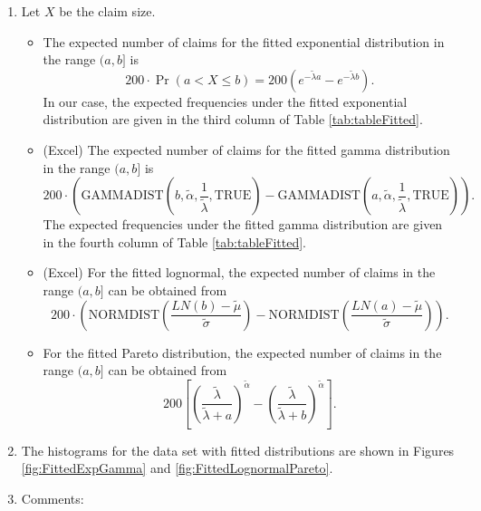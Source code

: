 \documentclass[landscape, 20pt]{extreport}
\theoremstyle{definition}
\theoremstyle{definition}
\theoremstyle{definition}
\theoremstyle{definition}
\theoremstyle{remark}
\begin{document}
\begin{enumerate}
\def\labelenumi{\arabic{enumi}.}
\setcounter{enumi}{4}
\item
  Let \(X\) be the claim size.

  \begin{itemize}
  \item
    The expected number of claims for the fitted exponential
    distribution in the range \((a,b]\) is
    \[200 \cdot \Pr( a < X \le b) = 200( e^{-\tilde{\lambda} a} - e^{-\tilde{\lambda} b} ).\]
    In our case, the expected frequencies under the fitted
    exponential distribution are given in the third column of Table \ref{tab:tableFitted}.
  \item
    (Excel) The expected number of claims for the fitted gamma distribution
    in the range \((a,b]\) is
    \[200 \cdot\left(  \text{GAMMADIST}\left(b, \tilde{\alpha}, \frac{1}{\tilde{\lambda}}, \text{TRUE}\right)  - \text{GAMMADIST}\left(a, \tilde{\alpha}, \frac{1}{\tilde{\lambda}}, \text{TRUE}\right) \right).\]
    The expected frequencies under the fitted gamma distribution are
    given in the fourth column of Table \ref{tab:tableFitted}.
  \item
    (Excel) For the fitted lognormal, the expected number of claims in the
    range \((a,b]\) can be obtained from
    \[200 \cdot\left(  \text{NORMDIST} \left(\frac{LN(b) - 
            \tilde{\mu}}{\tilde{\sigma}}\right)  - \text{NORMDIST}\left(\frac{LN(a) - 
            \tilde{\mu}}{\tilde{\sigma}}\right) \right).\]
  \item
    For the fitted Pareto distribution, the expected number of
    claims in the range \((a,b]\) can be obtained from
    \[200 \left[    \left(\frac{\tilde{\lambda}}{\tilde{\lambda} + a} \right)^{\tilde{\alpha}}  - \left(\frac{\tilde{\lambda}}{\tilde{\lambda} + b} \right)^{\tilde{\alpha}}   \right].\]
  \end{itemize}
\item
  The histograms for the data set with fitted distributions
  are shown in Figures \ref{fig:FittedExpGamma} and \ref{fig:FittedLognormalPareto}.
\item
  Comments:


\end{enumerate}
\end{document}
